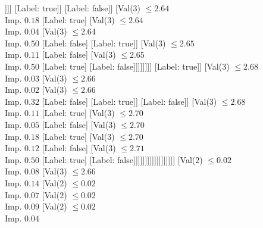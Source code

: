 \documentclass[margin=10pt]{standalone}
\begin{document}
\begin{forest}
																						[Val($3$) $ \leq 2.63$ \\ Imp. $0.12$
																							[Label: false]
																							[Val($3$) $ \leq 2.63$ \\ Imp. $0.50$
																								[Label: true]
																								[Label: false]]]]
																					[Label: true]]
																				[Label: false]]
																			[Val($3$) $ \leq 2.64$ \\ Imp. $0.18$
																				[Label: true]
																				[Val($3$) $ \leq 2.64$ \\ Imp. $0.04$
																					[Val($3$) $ \leq 2.64$ \\ Imp. $0.50$
																						[Label: false]
																						[Label: true]]
																					[Val($3$) $ \leq 2.65$ \\ Imp. $0.11$
																						[Label: false]
																						[Val($3$) $ \leq 2.65$ \\ Imp. $0.50$
																							[Label: true]
																							[Label: false]]]]]]]]
																[Label: true]]
															[Val($3$) $ \leq 2.68$ \\ Imp. $0.03$
																[Val($3$) $ \leq 2.66$ \\ Imp. $0.02$
																	[Val($3$) $ \leq 2.66$ \\ Imp. $0.32$
																		[Label: false]
																		[Label: true]]
																	[Label: false]]
																[Val($3$) $ \leq 2.68$ \\ Imp. $0.11$
																	[Label: true]
																	[Val($3$) $ \leq 2.70$ \\ Imp. $0.05$
																		[Label: false]
																		[Val($3$) $ \leq 2.70$ \\ Imp. $0.18$
																			[Label: true]
																			[Val($3$) $ \leq 2.70$ \\ Imp. $0.12$
																				[Label: false]
																				[Val($3$) $ \leq 2.71$ \\ Imp. $0.50$
																					[Label: true]
																					[Label: false]]]]]]]]]]]]]]]]]]
				[Val($2$) $ \leq 0.02$ \\ Imp. $0.08$
					[Val($3$) $ \leq 2.66$ \\ Imp. $0.14$
						[Val($2$) $ \leq 0.02$ \\ Imp. $0.07$
							[Val($2$) $ \leq 0.02$ \\ Imp. $0.09$
								[Val($2$) $ \leq 0.02$ \\ Imp. $0.04$

\end{forest}
\end{document}
